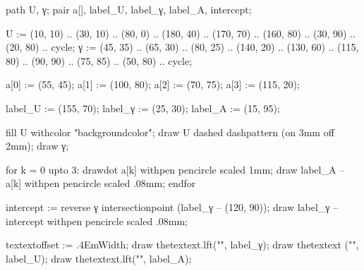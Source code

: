 \startenvironment[images]

\environment[colors]

  path U, γ;
  pair a[], label_U, label_γ, label_A, intercept;

  U := (10, 10) .. (30, 10) .. (80, 0) .. (180, 40) .. (170, 70)
    .. (160, 80) .. (30, 90) .. (20, 80) .. cycle;
  γ := (45, 35) .. (65, 30) .. (80, 25) .. (140, 20) .. (130, 60)
    .. (115, 80) .. (90, 90) .. (75, 85) .. (50, 80) .. cycle;

  a[0] := (55, 45);
  a[1] := (100, 80);
  a[2] := (70, 75);
  a[3] := (115, 20);

  label_U := (155, 70);
  label_γ := (25, 30);
  label_A := (15, 95);

  fill U withcolor "backgroundcolor";
  draw U dashed dashpattern (on 3mm off 2mm);
  draw γ;

  for k = 0 upto 3:
    drawdot a[k] withpen pencircle scaled 1mm;
    draw label_A -- a[k] withpen pencircle scaled .08mm;
  endfor

  intercept := reverse γ intersectionpoint (label_γ -- (120, 90));
  draw label_γ -- intercept withpen pencircle scaled .08mm;

  textextoffset := .4EmWidth;
  draw thetextext.lft("", label_γ);
  draw thetextext    ("", label_U);
  draw thetextext.lft("", label_A);
\stopuseMPgraphic

\stopenvironment

